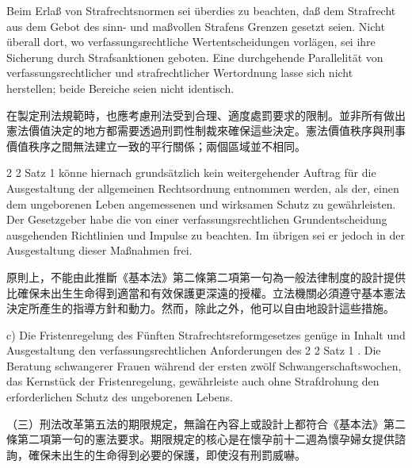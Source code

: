 \documentclass[12pt]{article}
\begin{document}
\syncleft
\begin{sourcepara}
Beim Erlaß von Strafrechtsnormen sei überdies zu beachten, daß dem Strafrecht aus dem Gebot des sinn- und maßvollen Strafens Grenzen gesetzt seien. Nicht überall dort, wo verfassungsrechtliche Wertentscheidungen vorlägen, sei ihre Sicherung durch Strafsanktionen geboten. Eine durchgehende Parallelität von verfassungsrechtlicher und strafrechtlicher Wertordnung lasse sich nicht herstellen; beide Bereiche seien nicht identisch.
\end{sourcepara}
\begin{transpara}
在製定刑法規範時，也應考慮刑法受到合理、適度處罰要求的限制。並非所有做出憲法價值決定的地方都需要透過刑罰性制裁來確保這些決定。憲法價值秩序與刑事價值秩序之間無法建立一致的平行關係；兩個區域並不相同。
\end{transpara}

\syncleft
\begin{sourcepara}
\abbrArt{} 2 \abbrAbs{} 2 Satz 1 \abbrGG{}\ggfnArtTwoTwoOneDE{} könne hiernach grundsätzlich kein weitergehender Auftrag für die Ausgestaltung der allgemeinen Rechtsordnung entnommen werden, als der, einen dem ungeborenen Leben angemessenen und wirksamen Schutz zu gewährleisten. Der Gesetzgeber habe die von einer verfassungsrechtlichen Grundentscheidung ausgehenden Richtlinien und Impulse zu beachten. Im übrigen sei er jedoch in der Ausgestaltung dieser Maßnahmen frei.
\end{sourcepara}
\begin{transpara}
原則上，不能由此推斷《基本法》第二條第二項第一句\ggfnArtTwoTwoOneZH{}為一般法律制度的設計提供比確保未出生生命得到適當和有效保護更深遠的授權。立法機關必須遵守基本憲法決定所產生的指導方針和動力。然而，除此之外，他可以自由地設計這些措施。
\end{transpara}

\syncleft
\begin{sourcepara}
c) Die Fristenregelung des Fünften Strafrechtsreformgesetzes genüge in Inhalt und Ausgestaltung den verfassungsrechtlichen Anforderungen des \abbrArt{} 2 \abbrAbs{} 2 Satz 1 \abbrGG{}\ggfnArtTwoTwoOneDE{}. Die Beratung schwangerer Frauen während der ersten zwölf Schwangerschaftswochen, das Kernstück der Fristenregelung, gewährleiste auch ohne Strafdrohung den erforderlichen Schutz des ungeborenen Lebens.
\end{sourcepara}
\begin{transpara}
（三）刑法改革第五法的期限規定，無論在內容上或設計上都符合《基本法》第二條第二項第一句\ggfnArtTwoTwoOneZH{}的憲法要求。期限規定的核心是在懷孕前十二週為懷孕婦女提供諮詢，確保未出生的生命得到必要的保護，即使沒有刑罰威嚇。
\end{transpara}
\end{document}
